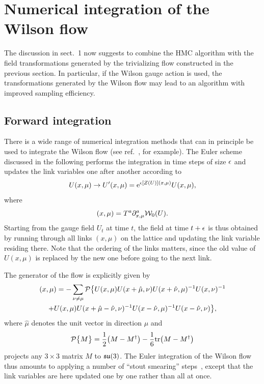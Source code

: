\section{Numerical integration of the Wilson flow}

The discussion in sect.~1 now suggests
to combine the HMC algorithm with
the field transformations generated by the
trivializing flow constructed in the previous section.
In particular, if the Wilson gauge action is used,
the transformations generated by the Wilson flow
may lead to an algorithm with improved sampling efficiency.


\subsection{Forward integration}

There is a wide range of numerical integration methods
that can in principle be used
to integrate the Wilson flow
(see ref.~\cite{HairerEtAl}, for example).
The Euler scheme discussed in the following
performs the integration in time steps of size $\epsilon$ and
updates the link variables one after another
according to
\begin{equation}
   U(x,\mu)\to U'(x,\mu)=\mathrm{e}^{\epsilon [Z(U)](x,\mu)}U(x,\mu),
\end{equation}
where
\begin{equation}
   [Z(U)](x,\mu)=T^a\du^a_{x,\mu}\Wl_0(U).
\end{equation}
Starting from the gauge field $U_t$ at time $t$,
the field at time $t+\epsilon$
is thus obtained by
running through all links $(x,\mu)$ on the lattice
and updating the link variable residing there.
Note that the ordering of the links matters, since
the old value of $U(x,\mu)$ is replaced by the
new one before going to the next link.

The generator of the flow is explicitly given by
\begin{multline}
   [Z(U)](x,\mu)=
   -\sum_{\nu\neq\mu}\Proj\bigl\{
   U(x,\mu)U(x+\hat{\mu},\nu)U(x+\hat{\nu},\mu)^{-1}U(x,\nu)^{-1}\\
   +U(x,\mu)U(x+\hat{\mu}-\hat{\nu},\nu)^{-1}U(x-\hat{\nu},\mu)^{-1}
   U(x-\hat{\nu},\nu)\bigr\},
\end{multline}
where $\hat{\mu}$ denotes the unit vector in direction $\mu$ and
\begin{equation}
   \mathcal{P}\bigl\{M\bigr\}=\frac{1}{2}\bigl(M-M^{\dagger}\bigr)-
   \frac{1}{6}\mathrm{tr}\bigl(M-M^{\dagger}\bigr)
\end{equation}
projects any $3\times3$ matrix $M$ to $\mathfrak{su}(3)$.
The Euler integration of the Wilson flow thus
amounts to applying a number of ``stout smearing'' steps~\cite{Stout},
except that the link variables are here updated one by one rather than
all at once.



